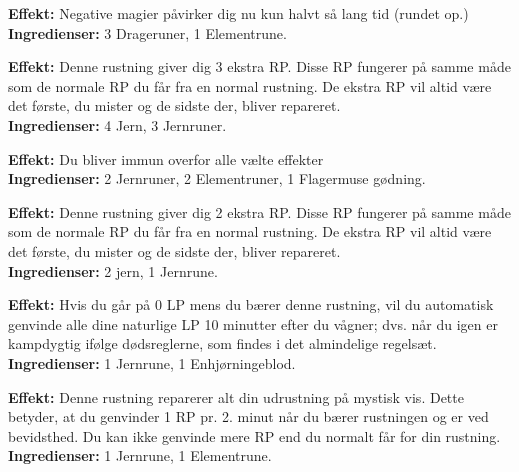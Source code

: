 \begin{runerustning*}
\textbf{Effekt:} Negative magier påvirker dig nu kun halvt så lang tid (rundet op.)\\
\textbf{Ingredienser:} 3 Drageruner, 1 Elementrune.
\end{runerustning*}

\begin{runerustning*}
\textbf{Effekt:} Denne rustning giver dig 3 ekstra RP. Disse RP fungerer på samme måde som de normale RP du får fra en normal rustning. De ekstra RP vil altid være det første, du mister og de sidste der, bliver repareret.\\
\textbf{Ingredienser:} 4 Jern, 3 Jernruner.
\end{runerustning*}

\begin{runerustning*}
\textbf{Effekt:} Du bliver immun overfor alle vælte effekter\\
\textbf{Ingredienser:} 2 Jernruner, 2 Elementruner, 1 Flagermuse gødning.
\end{runerustning*}

\begin{runerustning*}
\textbf{Effekt:} Denne rustning giver dig 2 ekstra RP. Disse RP fungerer på samme måde som de normale RP du får fra en normal rustning. De ekstra RP vil altid være det første, du mister og de sidste der, bliver repareret.\\
\textbf{Ingredienser:} 2 jern, 1 Jernrune.
\end{runerustning*}

\begin{runerustning*}
\textbf{Effekt:} Hvis du går på 0 LP mens du bærer denne rustning, vil du automatisk genvinde alle dine naturlige LP 10 minutter efter du vågner; dvs. når du igen er kampdygtig ifølge dødsreglerne, som findes i det almindelige regelsæt.\\
\textbf{Ingredienser:} 1 Jernrune, 1 Enhjørningeblod.
\end{runerustning*}

\begin{runerustning*}
\textbf{Effekt:} Denne rustning reparerer alt din udrustning på mystisk vis. Dette betyder, at du genvinder 1 RP pr. 2. minut når du bærer rustningen og er ved bevidsthed. Du kan ikke genvinde mere RP end du normalt får for din rustning.\\
\textbf{Ingredienser:} 1 Jernrune, 1 Elementrune.
\end{runerustning*}